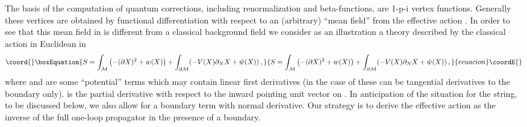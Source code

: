 \documentclass[a4paper,12pt]{article}
\begin{document}
The basis of the computation of quantum corrections, 
including renormalization and beta-functions, are 1-p-i 
vertex functions. Generally these vertices are obtained by 
functional differentiation with respect to an (arbitrary) 
``mean field'' \coordHE{} from the effective action \coordHE{}. In order to see that this mean field in \coordHE{} is different from 
a classical background field we consider as an illustration 
a theory described by the classical action in Euclidean in 
\coordHE{} 
\begin{equation}\coord{}\boxEquation{
S=\int_{\cal M} \left( -(\partial X)^2 +w(X)\right) +
\int_{\partial {\cal M}}( - V(X)\partial_N X +
\hat w(X) ) \,,\label{Sclassic}
}{
S=\int_{\cal M} \left( -(\partial X)^2 +w(X)\right) +
\int_{\partial {\cal M}}( - V(X)\partial_N X +
\hat w(X) ) \,,}{ecuacion}\coordE{}\end{equation}
where \coordHE{} and \coordHE{} are some ``potential'' terms
which may contain linear first derivatives (in the case of \coordHE{} these  can
be tangential derivatives to the boundary \coordHE{} only).
\coordHE{} is the partial derivative with respect to
the inward pointing unit vector on \coordHE{}. 
In anticipation of the situation for the string, to be discussed below, 
we also allow for a 
boundary  term \coordHE{} with  normal derivative.
Our strategy is to derive the effective action as the 
inverse of the full one-loop propagator in the presence of a 
boundary. 
\end{document}
